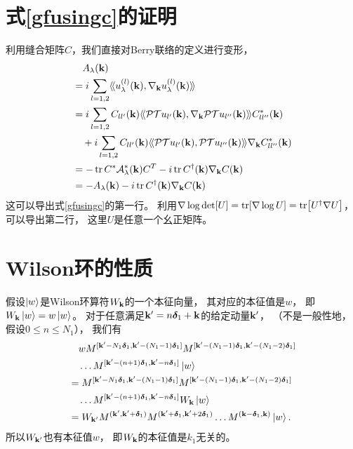 \section{式\eqref{gfusingc}的证明}\label{gfusingc1}
利用缝合矩阵$C$，我们直接对Berry联络的定义进行变形，
\begin{equation}
	\begin{split}
	&\quad	A_\lambda (\vb k)\\
	 &=i \sum_{l=1,2} \langle\!\langle u_\lambda ^{(l)}(\vb k),\nabla_{\vb k} u_\lambda ^{(l)}(\vb k) \rangle\!\rangle\\
		&= i\sum_{l=1,2} C_{ll'}(\vb k) \langle\!\langle \mathcal P\mathcal T u_{l'}(\vb k),\nabla_{\vb k} \mathcal P\mathcal T u_{l''}(\vb k) \rangle\!\rangle C^*_{ll''}(\vb k)\\
		&\quad + i\sum_{l=1,2} C_{ll'}(\vb k) \langle\!\langle \mathcal P\mathcal T u_{l'}(\vb k),\mathcal P\mathcal T u_{l''}(\vb k) \rangle\!\rangle \nabla_{\vb k} C^*_{ll''}(\vb k)\\
		&=-\tr C^* \mathcal A_\lambda ^*(\vb k) C^T-i\tr C^\dagger(\vb k) \nabla_{\vb k} C(\vb k)\\
		&= -A_\lambda (\vb k)-i\tr C^\dagger(\vb k) \nabla_{\vb k} C(\vb k)\nonumber
	\end{split}
\end{equation}
这可以导出式\eqref{gfusingc}的第一行。
利用$\nabla\log\det[U]=\tr[\nabla\log U]=\tr[U^\dagger \nabla U]$，可以导出第二行，
这里$U$是任意一个幺正矩阵。
\section{Wilson环的性质}\label{wlp}

假设$\ket{w}$是Wilson环算符$W_{\vb k}$的一个本征向量，
其对应的本征值是$w$，
即$W_{\vb k}\ket{w}=w \ket{w}$。
对于任意满足$\vb k'=n \boldsymbol{\delta}_1+\vb k$的给定动量$\vb k'$，
（不是一般性地，假设$0\leq n\leq N_1$），
我们有
\begin{equation}
\begin{split}
	&\quad wM^{[\vb k'-N_1\boldsymbol{\delta}_1,\vb k'-(N_1-1)\boldsymbol{\delta}_1]}M^{[\vb k'-(N_1-1)\boldsymbol{\delta}_1,\vb k'-(N_1-2)\boldsymbol{\delta}_1]}\\
	&\quad  \dots M^{[\vb k'-(n+1)\boldsymbol{\delta}_1,\vb k'-n\boldsymbol{\delta}_1]} \ket{w}\\
	 &=M^{[\vb k'-N_1\boldsymbol{\delta}_1,\vb k'-(N_1-1)\boldsymbol{\delta}_1]} M^{[\vb k'-(N_1-1)\boldsymbol{\delta}_1,\vb k'-(N_1-2)\boldsymbol{\delta}_1]}\\
	 &\quad  \dots M^{[\vb k'-(n+1)\boldsymbol{\delta}_1,\vb k'-n\boldsymbol{\delta}_1]} W_{\vb k}\ket{w}\\
	&=W_{\vb k'}M^{(\vb k',\vb k'+\boldsymbol{\delta}_1)}M^{(\vb k'+\boldsymbol{\delta}_1,\vb k'+2\boldsymbol{\delta}_1)} \dots M^{(\vb k-\boldsymbol{\delta}_1,\vb k)}\ket{w}.\nonumber
\end{split}
\end{equation}
所以$W_{\vb k'}$也有本征值$w$，
即$W_{\vb k}$的本征值是$k_1$无关的。

